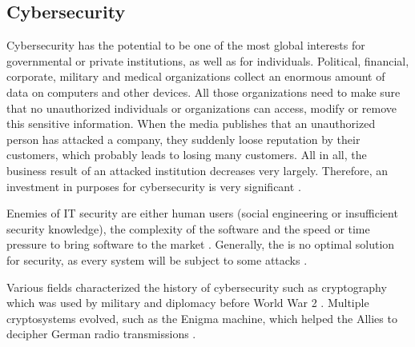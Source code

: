 \subsection{Cybersecurity}
\label{subsec:02_cybersecurity}

Cybersecurity has the potential to be one of the most global interests for governmental or private institutions, as well as for individuals. Political, financial, corporate, military and medical organizations collect an enormous amount of data on computers and other devices. All those organizations need to make sure that no unauthorized individuals or organizations can access, modify or remove this sensitive information. When the media publishes that an unauthorized person has attacked a company, they suddenly loose reputation by their customers, which probably leads to losing many customers. All in all, the business result of an attacked institution decreases very largely. Therefore, an investment in purposes for cybersecurity is very significant \cite{Bishop2003}.

Enemies of IT security are either human users (social engineering or insufficient security knowledge), the complexity of the software and the speed or time pressure to bring software to the market \cite{Bishop2003}. Generally, the is no optimal solution for security, as every system will be subject to some attacks \cite{Bishop2003}.

Various fields characterized the history of cybersecurity such as cryptography which was used by military and diplomacy before World War 2 \cite{Bishop2003}. Multiple cryptosystems evolved, such as the Enigma machine, which helped the Allies to decipher German radio transmissions \cite{Kahn1991}.

